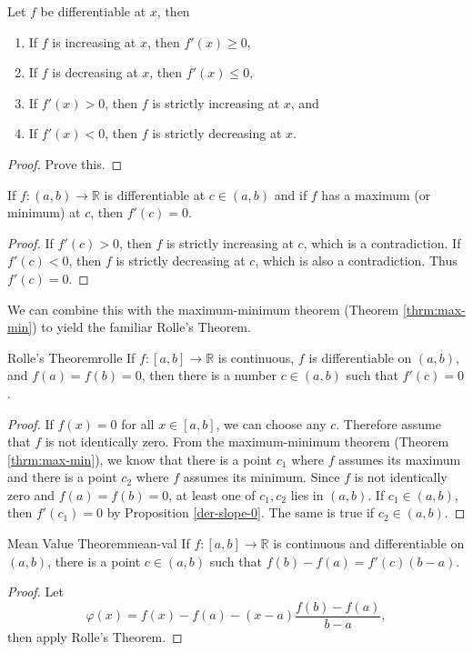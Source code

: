 \documentclass[10pt]{report}
\begin{document}
\begin{thrm}{}{}
Let $f$ be differentiable at $x$, then
\begin{enumerate}
	\item If $f$ is increasing at $x$, then $f'(x) \geq 0$,
	\item If $f$ is decreasing at $x$, then $f'(x) \leq 0$,
	\item If $f'(x) > 0$, then $f$ is strictly increasing at $x$, and
	\item If $f'(x) < 0$, then $f$ is strictly decreasing at $x$.
\end{enumerate}
\end{thrm}
\begin{proof}
	{\color{red}Prove this.}
\end{proof}

\begin{prop}
	\label{der-slope-0}
	If $f:(a,b) \to \mathbb{R}$ is differentiable at $c \in (a,b)$ and if $f$ has a maximum (or minimum) at $c$, then $f'(c) = 0$.
\end{prop}
\begin{proof}
	If $f'(c) > 0$, then $f$ is strictly increasing at $c$, which is a contradiction. If $f'(c) < 0$, then $f$ is strictly decreasing at $c$, which is also a contradiction. Thus $f'(c)=0$.
\end{proof}

We can combine this with the maximum-minimum theorem (Theorem \ref{thrm:max-min}) to yield the familiar Rolle's Theorem.

\begin{thrm}{Rolle's Theorem}{rolle}
	If $f:[a,b] \to \mathbb{R}$ is continuous, $f$ is differentiable on $(a,b)$, and $f(a) = f(b) = 0$, then there is a number $c \in (a,b)$ such that $f'(c) = 0$.
\end{thrm}
\begin{proof}
	If $f(x) = 0$ for all $x \in [a,b]$, we can choose any $c$. Therefore assume that $f$ is not identically zero. From the maximum-minimum theorem (Theorem \ref{thrm:max-min}), we know that there is a point $c_1$ where $f$ assumes its maximum and there is a point $c_2$ where $f$ assumes its minimum. Since $f$ is not identically zero and $f(a)=f(b)=0$, at least one of $c_1,c_2$ lies in $(a,b)$. If $c_1 \in (a,b)$, then $f'(c_1)=0$ by Proposition \ref{der-slope-0}. The same is true if $c_2 \in (a,b)$.
\end{proof}

\begin{thrm}{Mean Value Theorem}{mean-val}
	If $f:[a,b] \to \mathbb{R}$ is continuous and differentiable on $(a,b)$, there is a point $c \in (a,b)$ such that $f(b) - f(a) = f'(c) (b-a)$.
\end{thrm}
\begin{proof}
	Let \[\varphi(x) = f(x)-f(a)-(x-a)\frac{f(b)-f(a)}{b-a}, \]
	then apply Rolle's Theorem.
\end{proof}
\end{document}
